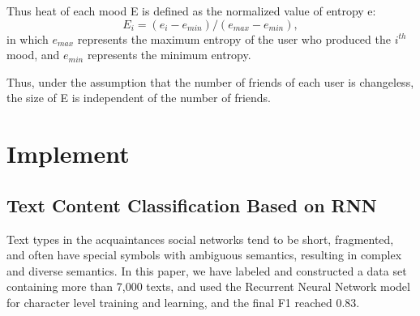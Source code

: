 \documentclass[10pt,twocolumn,letterpaper]{article}
\begin{document}
    Thus heat of each mood E is defined as the normalized value of entropy e:
    \begin{equation}
    E_{i} = (e_{i}-e_{min})/(e_{max}-e_{min}),
    \end{equation}
    in which $e_{max}$ represents the maximum entropy of the user who produced the $i^{th}$ mood, and $e_{min}$ represents the minimum entropy.

    Thus, under the assumption that the number of friends of each user is changeless, the size of E is independent of the number of friends.

\section{Implement}

\subsection{Text Content Classification Based on RNN}
    Text types in the acquaintances social networks tend to be short, fragmented, and often have special symbols with ambiguous semantics, resulting in complex and diverse semantics.
    In this paper, we have labeled and constructed a data set containing more than 7,000 texts, and used the Recurrent Neural Network model for character level training and learning, and the final F1 reached 0.83.
\end{document}
